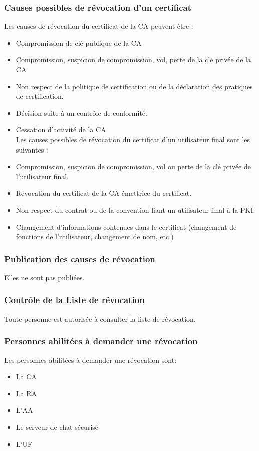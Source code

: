 \documentclass[a4paper,11pt,french]{book}
\begin{document}
\subsubsection{Causes possibles de révocation d'un certificat}

Les causes de révocation du certificat de la CA peuvent être :
\begin{itemize}
\item Compromission de clé publique de la CA
\item Compromission, suspicion de compromission, vol, perte de la clé privée de la CA
\item Non respect de la politique de certification ou de la déclaration des pratiques de certification.
\item Décision suite à un contrôle de conformité.
\item Cessation d’activité de la CA.
\\

Les causes possibles de révocation du certificat d’un utilisateur final sont les suivantes :
\item Compromission, suspicion de compromission, vol ou perte de la clé privée de l’utilisateur final.
\item Révocation du certificat de la CA émettrice du certificat.
\item Non respect du contrat ou de la convention liant un utilisateur final à la PKI.
\item Changement d’informations contenues dans le certificat (changement de fonctions de l’utilisateur, changement de nom, etc.)

\end{itemize}

\subsubsection{Publication des causes de révocation}
Elles ne sont pas publiées.

\subsubsection{Contrôle de la Liste de révocation}
Toute personne est autorisée à consulter la liste de révocation.

\subsubsection{Personnes abilitées à demander une révocation}
Les personnes abilitées à demander une révocation sont:
\begin{itemize}
\item La CA
\item La RA
\item L'AA
\item Le serveur de chat sécurisé
\item L'UF
\end{itemize}
\end{document}
